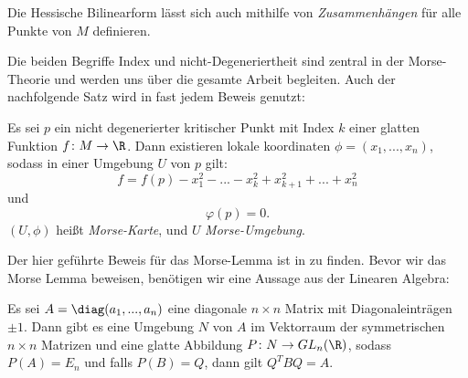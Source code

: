 Die Hessische Bilinearform lässt sich auch mithilfe von \textit{Zusammenhängen} für 
alle Punkte von $M$ definieren.

\begin{remark}
    Die beiden Begriffe Index und nicht-Degeneriertheit sind zentral in der Morse-Theorie 
    und werden uns über die gesamte Arbeit begleiten. Auch der nachfolgende Satz wird in 
    fast jedem Beweis genutzt:
\end{remark}

\begin{theorem}
    \label{satz: morse-lemma}
    Es sei $p$ ein nicht degenerierter kritischer Punkt mit Index $k$ einer glatten 
    Funktion $f \colon M \to \R$. Dann existieren lokale koordinaten 
    $\phi = (x_1, ..., x_n)$, sodass in einer Umgebung $U$ von $p$ gilt:
    \[ f = f(p) - x_1^2 - ... - x_k^2 + x_{k + 1}^2 + ... + x_n^2 \]
    und 
    \[ \varphi (p) = 0. \]
    $(U, \phi)$ heißt \textit{Morse-Karte}, und $U$ \textit{Morse-Umgebung}.
\end{theorem}

Der hier geführte Beweis für das Morse-Lemma ist in \cite{hirsch} zu finden. 
Bevor wir das Morse Lemma beweisen, benötigen wir eine Aussage aus der Linearen Algebra:

\begin{lemma}
    \label{lemma: lina lemma}
    Es sei $A = \diag(a_1, ..., a_n)$ eine diagonale $n \times n$ Matrix mit 
    Diagonaleinträgen $\pm 1$. Dann gibt es eine Umgebung $N$ von $A$ im Vektorraum der 
    symmetrischen $n \times n$ Matrizen und eine glatte Abbildung 
    $P \colon N \to GL_n(\R)$, sodass $P(A) = E_n$ und falls $P(B) = Q$, dann gilt 
    $Q^TBQ = A$.
\end{lemma}

